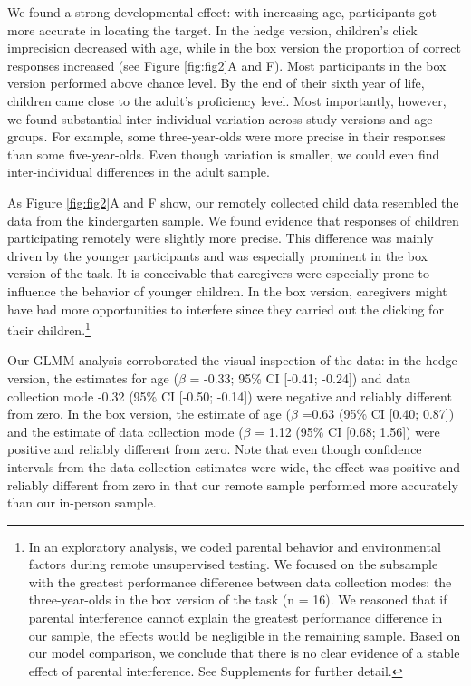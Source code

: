 \documentclass[
  man,floatsintext]{apa6}
\begin{document}
We found a strong developmental effect: with increasing age, participants got more accurate in locating the target.
In the hedge version, children's click imprecision decreased with age, while in the box version the proportion of correct responses increased (see Figure \ref{fig:fig2}A and F).
Most participants in the box version performed above chance level.
By the end of their sixth year of life, children came close to the adult's proficiency level.
Most importantly, however, we found substantial inter-individual variation across study versions and age groups.
For example, some three-year-olds were more precise in their responses than some five-year-olds.
Even though variation is smaller, we could even find inter-individual differences in the adult sample.

As Figure \ref{fig:fig2}A and F show, our remotely collected child data resembled the data from the kindergarten sample.
We found evidence that responses of children participating remotely were slightly more precise.
This difference was mainly driven by the younger participants and was especially prominent in the box version of the task.
It is conceivable that caregivers were especially prone to influence the behavior of younger children.
In the box version, caregivers might have had more opportunities to interfere since they carried out the clicking for their children.\footnote{In an exploratory analysis, we coded parental behavior and environmental factors during remote unsupervised testing.
  We focused on the subsample with the greatest performance difference between data collection modes: the three-year-olds in the box version of the task (n = 16).
  We reasoned that if parental interference cannot explain the greatest performance difference in our sample, the effects would be negligible in the remaining sample.
  Based on our model comparison, we conclude that there is no clear evidence of a stable effect of parental interference.
  See Supplements for further detail.}

Our GLMM analysis corroborated the visual inspection of the data: in the hedge version, the estimates for age (\(\beta\) = -0.33; 95\% CI {[}-0.41; -0.24{]}) and data collection mode -0.32 (95\% CI {[}-0.50; -0.14{]}) were negative and reliably different from zero.
In the box version, the estimate of age (\(\beta\) =0.63 (95\% CI {[}0.40; 0.87{]}) and the estimate of data collection mode (\(\beta\) = 1.12 (95\% CI {[}0.68; 1.56{]}) were positive and reliably different from zero.
Note that even though confidence intervals from the data collection estimates were wide, the effect was positive and reliably different from zero in that our remote sample performed more accurately than our in-person sample.
\end{document}
